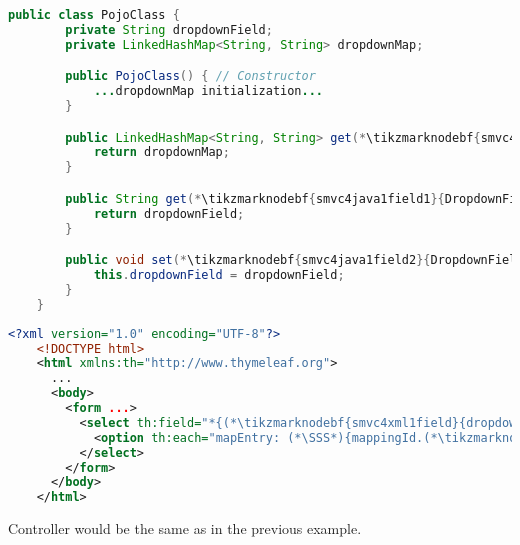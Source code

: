 \begin{lstlisting}[language=Java, title={POJO class with one String field}]
    public class PojoClass {
        private String dropdownField;
        private LinkedHashMap<String, String> dropdownMap;

        public PojoClass() { // Constructor
            ...dropdownMap initialization...
        }

        public LinkedHashMap<String, String> get(*\tikzmarknodebf{smvc4java1map}{DropdownMap}*)() {
            return dropdownMap;
        }

        public String get(*\tikzmarknodebf{smvc4java1field1}{DropdownField}*)() {
            return dropdownField;
        }

        public void set(*\tikzmarknodebf{smvc4java1field2}{DropdownField}*)(String dropdownField) {
            this.dropdownField = dropdownField;
        }
    }
\end{lstlisting}
\begin{lstlisting}[language=XML, title={HTML form setting the field}]
    <?xml version="1.0" encoding="UTF-8"?>
    <!DOCTYPE html>
    <html xmlns:th="http://www.thymeleaf.org">
      ...
      <body>
        <form ...>
          <select th:field="*{(*\tikzmarknodebf{smvc4xml1field}{dropdownField}[ForestGreen]*)}">
            <option th:each="mapEntry: (*\SSS*){mappingId.(*\tikzmarknodebf{smvc4xml1map}{dropdownMap}[ForestGreen]*).entrySet()}" th:value="${mapEntry.key}" th:text="${mapEntry.value}"/>
          </select>
        </form>
      </body>
    </html>
\end{lstlisting}

\notenonl Controller would be the same as in the previous example.
\newpage

